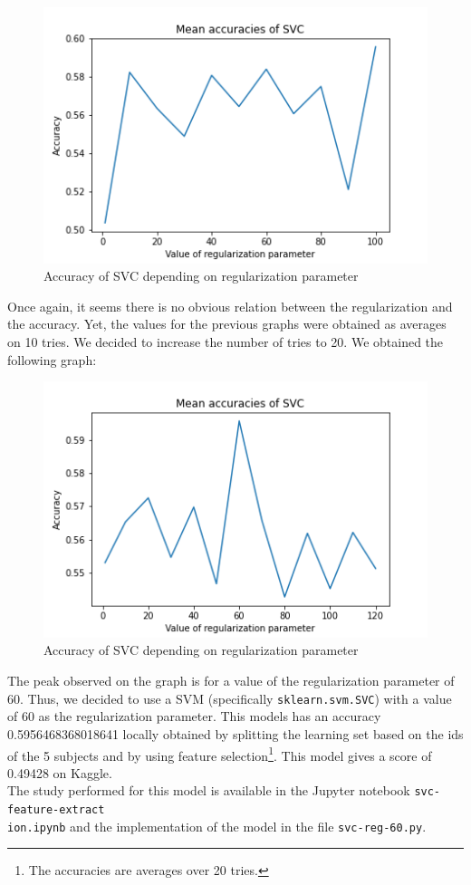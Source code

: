 \documentclass[a4paper, 11pt, oneside]{article}
\begin{document}
\begin{figure}[H]
\centering
\includegraphics[scale=0.4]{svm/svm_svc_accuracies_2.png}
\caption{Accuracy of SVC depending on regularization parameter}
\end{figure}
Once again, it seems there is no obvious relation between the regularization and the accuracy. Yet, the values for the previous graphs were obtained as averages on 10 tries. We decided to increase the number of tries to 20. We obtained the following graph:
\begin{figure}[H]
\centering
\includegraphics[scale=0.4]{svm/svm_svc_accuracies_4.png}
\caption{Accuracy of SVC depending on regularization parameter}
\end{figure}
The peak observed on the graph is for a value of the regularization parameter of 60. Thus, we decided to use a SVM (specifically \texttt{sklearn.svm.SVC}) with a value of 60 as the regularization parameter. This models has an accuracy 0.5956468368018641 locally obtained by splitting the learning set based on the ids of the 5 subjects and by using feature selection\footnote{The accuracies are averages over 20 tries.}. This model gives a score of 0.49428 on Kaggle.\\
The study performed for this model is available in the Jupyter notebook \texttt{svc-feature-extract\\ion.ipynb} and the implementation of the model in the file \texttt{svc-reg-60.py}.
\end{document}
